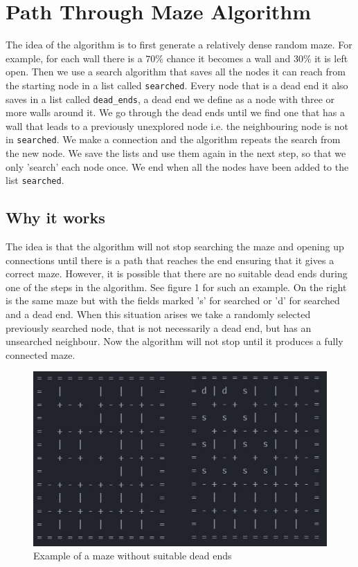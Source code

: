 \documentclass[10pt, a4paper, twoside]{amsart}
\newcommand{\1}{\mathbbm{1}}
\begin{document}
\section{Path Through Maze Algorithm}
The idea of the algorithm is to first generate a relatively dense random maze. For example, for each wall there is a $70\%$ chance it becomes a wall and $30\%$ it is left open. Then we use a search algorithm that saves all the nodes it can reach from the starting node in a list called \verb+searched+. Every node that is a dead end it also saves in a list called \verb+dead_ends+, a dead end we define as a node with three or more walls around it. We go through the dead ends until we find one that has a wall that leads to a previously unexplored node i.e. the neighbouring node is not in \verb+searched+. We make a connection and the algorithm repeats the search from the new node. We save the lists and use them again in the next step, so that we only 'search' each node once. We end when all the nodes have been added to the list \verb+searched+.

\subsection{Why it works}
The idea is that the algorithm will not stop searching the maze and opening up connections until there is a path that reaches the end ensuring that it gives a correct maze. However, it is possible that there are no suitable dead ends during one of the steps in the algorithm. See figure 1 for such an example. On the right is the same maze but with the fields marked 's' for searched or 'd' for searched and a dead end. When this situation arises we take a randomly selected previously searched node, that is not necessarily a dead end, but has an unsearched neighbour. Now the algorithm will not stop until it produces a fully connected maze.

\begin{figure}
\centering
        \includegraphics[totalheight=8cm]{nodeadends}
    \caption{Example of a maze without suitable dead ends}
\end{figure}
\end{document}

